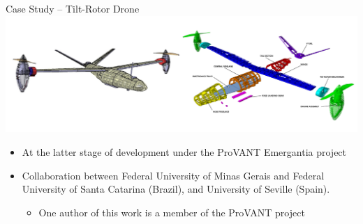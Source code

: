 \documentclass[11pt, aspectratio=169, table]{beamer}
\begin{document}
\begin{frame}{Case Study -- Tilt-Rotor Drone}
\centering
\includegraphics[width=\textwidth]{images/drone-overview.png}
\vspace{-8mm}
\begin{block}{}
	\begin{itemize}
		\item At the latter stage of development under the ProVANT Emergantia project
		
		\item Collaboration between Federal University of Minas Gerais and Federal University of Santa Catarina (Brazil), and University of Seville (Spain).
		\begin{itemize}
    		\item One author of this work is a member of the ProVANT project
    		\end{itemize}
	\end{itemize}
\end{block}
\end{frame}
\end{document}

